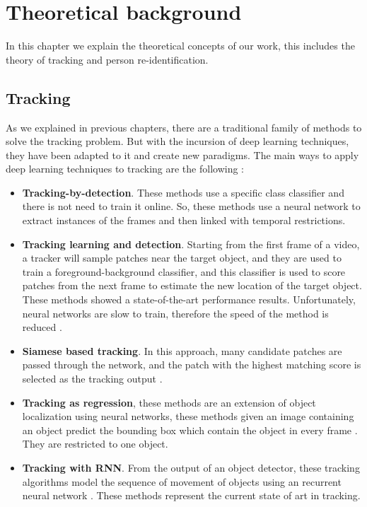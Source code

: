\chapter{Theoretical background}\label{cap.theoretic}

In this chapter we explain the theoretical concepts of our work, this includes the theory of tracking and person re-identification.

\section{Tracking}


As we explained in previous chapters, there are a traditional family of methods to solve the tracking problem. But with the incursion of deep learning techniques, they have been adapted to it and create new paradigms. The main ways to apply deep learning techniques to tracking are the following \cite{thrun}:


\begin{itemize}


\item \textbf{Tracking-by-detection}. These methods use a specific class classifier and there is not need to train it online. So, these methods use a neural network to extract instances of the frames and then linked with temporal restrictions. 

\item \textbf{Tracking learning and detection}. Starting from the first frame of a video, a tracker will sample patches near the target object, and they are used to train a foreground-background  classifier, and this classifier is used to score patches from the next frame to estimate the new location of the target object. These methods showed a state-of-the-art performance results. Unfortunately, neural networks are slow to train, therefore the speed of the method is reduced \cite{deep1} \cite{deep2}.


\item \textbf{Siamese based tracking}. In this approach, many candidate patches are passed through the network, and the patch with the highest matching score is selected as the tracking output \cite{trackingSiamese}.


\item \textbf{Tracking as regression}, these methods are an extension of object localization using neural networks, these methods given an image containing an object predict the bounding box which contain the object in every frame \cite{thrun}. They are restricted to one object.


\item \textbf{Tracking with RNN}. From the output of an object detector, these tracking algorithms model the sequence of movement of objects using an recurrent neural network \cite{savaresee}. These methods represent the current state of art in tracking.


\end{itemize}



